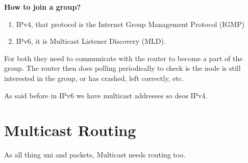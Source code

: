 \documentclass[12pt]{book}
\begin{document}
\textbf{How to join a group?}
\begin{enumerate}
    \item IPv4, that protocol is the Internet Group Management Protocol (IGMP)
    \item IPv6, it is Multicast Listener Discovery (MLD).
\end{enumerate}
For both they need to communicate with the router to become a part of the group. The router then does polling periodically to check is the node is still interested in the group, or has crashed, left correctly, etc.

As said before in IPv6 we have multicast addresses so deos IPv4.

\section{Multicast Routing}
As all thing uni and packets, Multicast needs routing too.
\end{document}
